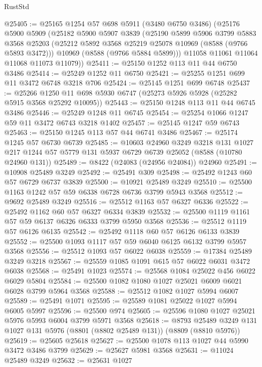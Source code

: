\begin{lexlean}{RustStd}
\begin{coremodule}
@25405 := @25165
    @1254
    @57
    @698
    @5911
    (@3480 @6750 @3486)
    (@25176
      @5900
      @5909
      (@25182
        @5900
        @5907
        @3839
        (@25190
          @5899
          @5906
          @3799
          @5883
          @3568
          @25203
          (@25212 @5892 @3568 @25219 @25078 @10969 (@8588 (@9766 @5893 @3472)))
          @10969
          (@8588 (@9766 @5884 @5899)))
        @11058
        @11061
        @11064
        @11068
        @11073
        @11079))
@25411 := @25150 @1252 @113 @11 @44 @6750 @3486
@25414 := @25249 @1252 @11 @6750
@25421 := @25255 @1251 @699 @11 @3472 @6748 @3218 @706
@25424 := @25145 @1251 @699 @6748
@25437 := @25266 @1250 @11 @698 @5930 @6747 (@25273 @5926 @5928 (@25282 @5915 @3568 @25292 @10095))
@25443 := @25150 @1248 @113 @11 @44 @6745 @3486
@25446 := @25249 @1248 @11 @6745
@25454 := @25254 @1066 @1247 @59 @11 @3472 @6743 @3218 @1402
@25457 := @25145 @1247 @59 @6743
@25463 := @25150 @1245 @113 @57 @44 @6741 @3486
@25467 := @25174 @1245 @57 @6730 @6739
@25485 := @10603
    @24960
    @3249
    @3218
    @131
    @1027
    @217
    @1244
    @57
    @5779
    @131
    @5937
    @6729
    @6739
    @25052
    (@8588 (@10780 @24960 @131))
@25489 := @8422 (@24083 (@24956 @24084)) @24960
@25491 := @10908 @25489 @3249
@25492 := @25491 @309
@25498 := @25492 @1243 @60 @57 @6729 @6737 @3839
@25500 := @10921 @25489 @3249
@25510 := @25500 @1163 @1242 @57 @59 @6338 @6728 @6736 @3799 @5943 @3568
@25512 := @9692 @25489 @3249
@25516 := @25512 @1163 @57 @6327 @6336
@25522 := @25492 @1162 @60 @57 @6327 @6334 @3839
@25532 := @25500 @1119 @1161 @57 @59 @6137 @6326 @6333 @3799 @5950 @3568
@25536 := @25512 @1119 @57 @6126 @6135
@25542 := @25492 @1118 @60 @57 @6126 @6133 @3839
@25552 := @25500 @1093 @1117 @57 @59 @6040 @6125 @6132 @3799 @5957 @3568
@25556 := @25512 @1093 @57 @6022 @6038
@25559 := @17384 @25489 @3249 @3218
@25567 := @25559 @1085 @1091 @615 @57 @6022 @6031 @3472 @6038
@25568 := @25491 @1023
@25574 := @25568 @1084 @25022 @456 @6022 @6029 @5804
@25584 := @25500 @1082 @1080 @1027 @25021 @6009 @6021 @6028 @3799 @5964 @3568
@25588 := @25512 @1082 @1027 @5994 @6007
@25589 := @25491 @1071
@25595 := @25589 @1081 @25022 @1027 @5994 @6005 @5997
@25596 := @25500 @974
@25605 := @25596 @1080 @1027 @25021 @5976 @5993 @6004 @3799 @5971 @3568
@25618 := @8793 @25489 @3249 @131 @1027 @131 @5976 (@8801 (@8802 @25489 @131)) (@8809 (@8810 @5976))
@25619 := @25605 @25618
@25627 := @25500 @1078 @113 @1027 @44 @5990 @3472 @3486 @3799
@25629 := @25627 @5981 @3568
@25631 := @11024 @25489 @3249
@25632 := @25631 @1027

\end{coremodule}
\end{lexlean}
